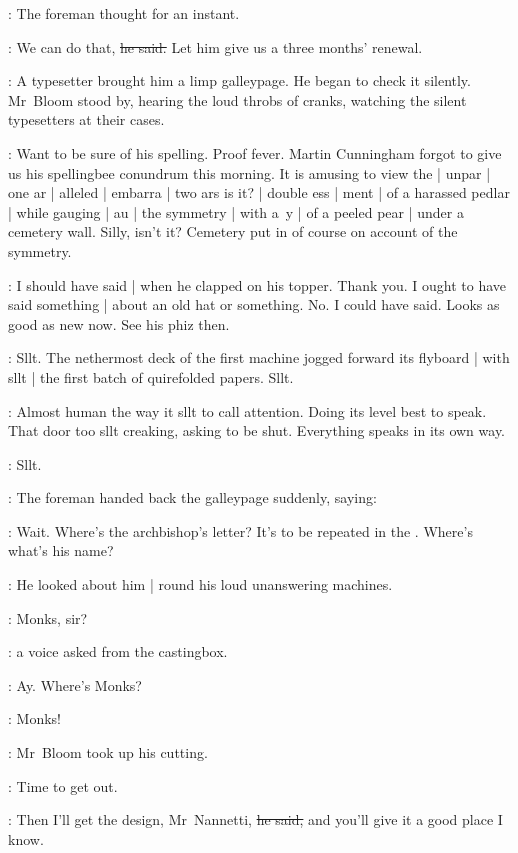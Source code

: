 :
The foreman thought for an instant.

\foreman:
We can do that,
\sout{he said.}
Let him give us a three months' renewal.

:
A typesetter brought him a limp galleypage.
He began to check it silently.
Mr~Bloom stood by,
hearing the loud throbs of cranks,
watching the silent typesetters at their cases.



\BloomInt:
Want to be sure of his spelling.
Proof fever.
Martin Cunningham forgot to give us his spellingbee conundrum this morning.
It is amusing to view the |
unpar |
one ar |
alleled |
embarra |
two ars is it? |
double ess |
ment |
of a harassed pedlar |
while gauging |
au |
the symmetry |
with a~y |
of a peeled pear |
under a cemetery wall.
Silly, isn't it?
Cemetery put in of course
on account of the symmetry.%

\BloomInt:
I should have said |
when he clapped on his topper.
Thank you.
I ought to have said something |
about an old hat or something.
No.
I could have said.
Looks as good as new now.
See his phiz then.

:
Sllt.
The nethermost deck of the first machine
jogged forward its flyboard |
with sllt |
the first batch of quirefolded papers.
Sllt.

\BloomInt:
Almost human the way it sllt to call attention.
Doing its level best to speak.
That door too sllt creaking, asking to be shut.
Everything speaks in its own way.

:
Sllt.




:
The foreman handed back the galleypage suddenly,
saying:

\foreman:
Wait.
Where's the archbishop's letter?
It's to be repeated in the .
Where's what's his name?

:
He looked about him |
round his loud unanswering machines.

\voice:
Monks, sir?

:
a voice asked from the castingbox.

\foreman:
Ay.
Where's Monks?

\foreman:
Monks!

:
Mr~Bloom took up his cutting.

\BloomInt:
Time to get out.

\Bloom:
Then I'll get the design, Mr~Nannetti,
\sout{he said,}
and you'll give it a good place I know.

